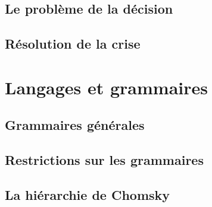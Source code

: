\documentclass[9pt, handout]{beamer}
\begin{document}
\subsection{Le problème de la décision}








 
\subsection{Résolution de la crise}





 
\section{Langages et grammaires}
 
\subsection{Grammaires générales}




 
\subsection{Restrictions sur les grammaires}




 
\subsection{La hiérarchie de Chomsky}




 
\end{document}
